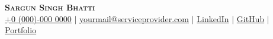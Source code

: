 

\begin{center}
    \textbf{\Huge \scshape Sargun Singh Bhatti} \\ \vspace{3pt}
        \small
    \faMobile \hspace{.5pt} \href{tel:0000000000}{+0 (000)-000 0000}
        $|$
    \faAt \hspace{.5pt} \href{mailto:yourmail@serviceprovider.com}{yourmail@serviceprovider.com}
        $|$
    \faLinkedinSquare \hspace{.5pt} \href{https://www.google.com}{LinkedIn}
        $|$
    \faGithub \hspace{.5pt} \href{https://www.google.com}{GitHub}
        $|$
        \faGlobe \hspace{.5pt} \href{https://www.google.com}{Portfolio}
\end{center}
